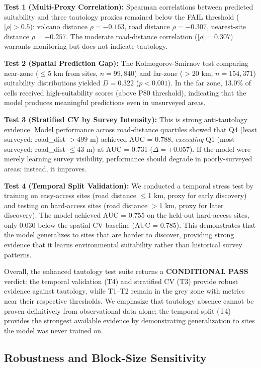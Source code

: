 \documentclass[12pt]{article}
\begin{document}
\textbf{Test 1 (Multi-Proxy Correlation):} Spearman correlations between predicted suitability and three tautology proxies remained below the FAIL threshold ($|\rho| > 0.5$): volcano distance $\rho = -0.163$, road distance $\rho = -0.307$, nearest-site distance $\rho = -0.257$. The moderate road-distance correlation ($|\rho| = 0.307$) warrants monitoring but does not indicate tautology.

\textbf{Test 2 (Spatial Prediction Gap):} The Kolmogorov-Smirnov test comparing near-zone ($\leq$5 km from sites, $n = 99{,}840$) and far-zone ($>$20 km, $n = 154{,}371$) suitability distributions yielded $D = 0.322$ ($p < 0.001$). In the far zone, 13.0\% of cells received high-suitability scores (above P80 threshold), indicating that the model produces meaningful predictions even in unsurveyed areas.

\textbf{Test 3 (Stratified CV by Survey Intensity):} This is strong anti-tautology evidence. Model performance across road-distance quartiles showed that Q4 (least surveyed; road\_dist $> 499$ m) achieved AUC = 0.788, \textit{exceeding} Q1 (most surveyed; road\_dist $\leq 43$ m) at AUC = 0.731 ($\Delta = +0.057$). If the model were merely learning survey visibility, performance should degrade in poorly-surveyed areas; instead, it improves.

\textbf{Test 4 (Temporal Split Validation):} We conducted a temporal stress test by training on easy-access sites (road distance $\leq$1 km, proxy for early discovery) and testing on hard-access sites (road distance $>$1 km, proxy for later discovery). The model achieved AUC = 0.755 on the held-out hard-access sites, only 0.030 below the spatial CV baseline (AUC = 0.785). This demonstrates that the model generalizes to sites that are harder to discover, providing strong evidence that it learns environmental suitability rather than historical survey patterns.

Overall, the enhanced tautology test suite returns a \textbf{CONDITIONAL PASS} verdict: the temporal validation (T4) and stratified CV (T3) provide robust evidence against tautology, while T1--T2 remain in the grey zone with metrics near their respective thresholds. We emphasize that tautology absence cannot be proven definitively from observational data alone; the temporal split (T4) provides the strongest available evidence by demonstrating generalization to sites the model was never trained on.

\subsection{Robustness and Block-Size Sensitivity}
\end{document}

